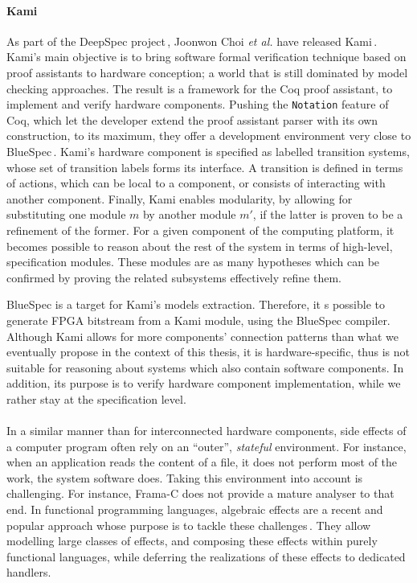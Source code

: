 \paragraph{Kami}
%
As part of the DeepSpec project\,\cite{appel2017deepspec}, Joonwon Choi \emph{et
  al.} have released Kami\,\cite{choi2017kami}.
%
Kami's main objective is to bring software formal verification technique based
on proof assistants to hardware conception; a world that is still dominated by
model checking approaches.
%
The result is a framework for the Coq proof assistant, to implement and verify
hardware components.
%
Pushing the \texttt{Notation} feature of Coq, which let the developer extend
the proof assistant parser with its own construction, to its maximum, they offer
a development environment very close to BlueSpec\,\cite{nikhil2004bluespec}.
%
Kami's hardware component is specified as labelled transition systems, whose set
of transition labels forms its interface.
%
A transition is defined in terms of actions, which can be local to a component,
or consists of interacting with another component.
%
Finally, Kami enables modularity, by allowing for substituting one module $m$ by
another module $m'$, if the latter is proven to be a refinement of the former.
%
For a given component of the computing platform, it becomes possible to reason
about the rest of the system in terms of high-level, specification modules.
%
These modules are as many hypotheses which can be confirmed by proving the
related subsystems effectively refine them.

BlueSpec is a target for Kami's models extraction.
%
Therefore, it s possible to generate FPGA bitstream from a Kami module, using
the BlueSpec compiler.
%
Although Kami allows for more components’ connection patterns than what we
eventually propose in the context of this thesis, it is hardware-specific, thus
is not suitable for reasoning about systems which also contain software
components.
%
In addition, its purpose is to verify hardware component implementation, while
we rather stay at the specification level.

\paragraph{}
%
In a similar manner than for interconnected hardware components, side effects of
a computer program often rely on an ``outer'', \emph{stateful} environment.
%
For instance, when an application reads the content of a file, it does not
perform most of the work, the system software does.
%
Taking this environment into account is challenging.
%
For instance, Frama-C does not provide a mature analyser to that end.
%
In functional programming languages, algebraic effects are a recent and popular
approach whose purpose is to tackle these
challenges\,\cite{brady2014effects,bauer2015effects}.
%
They allow modelling large classes of effects, and composing these effects
within purely functional languages, while deferring the realizations of these
effects to dedicated handlers.

